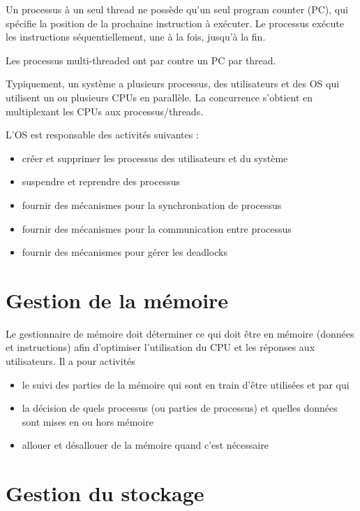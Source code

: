 		Un processus à un seul thread ne possède qu'un seul program counter (PC), qui spécifie la position de la prochaine instruction à exécuter. Le processus exécute les instructions séquentiellement, une à la fois, jusqu'à la fin.
		
		Les processus multi-threaded ont par contre un PC par thread.
		
		Typiquement, un système a plusieurs processus, des utilisateurs et des OS qui utilisent un ou plusieurs CPUs en parallèle. La concurrence s'obtient en multiplexant les CPUs aux processus/threads.
		
		L'OS est responsable des activités suivantes :
		
		\begin{itemize}
			\item créer et supprimer les processus des utilisateurs et du système
			\item suspendre et reprendre des processus
			\item fournir des mécanismes pour la synchronisation de processus
			\item fournir des mécanismes pour la communication entre processus
			\item fournir des mécanismes pour gérer les deadlocks
		\end{itemize}
		
\section{Gestion de la mémoire}

Le gestionnaire de mémoire doit déterminer ce qui doit être en mémoire (données et instructions) afin d'optimiser l'utilisation du CPU et les réponses aux utilisateurs. Il a pour activités

\begin{itemize}
	\item le suivi des parties de la mémoire qui sont en train d'être utilisées et par qui
	\item la décision de quels processus (ou parties de processus) et quelles données sont mises en ou hors mémoire
	\item allouer et désallouer de la mémoire quand c'est nécessaire
\end{itemize}

\section{Gestion du stockage}

